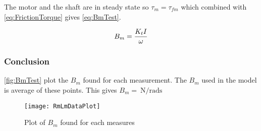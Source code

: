 The motor and the shaft are in steady state so $\tau_m=\tau_{fm}$ which combined with \autoref{eq:FrictionTorque} gives \autoref{eq:BmTest}.

\begin{equation}\label{eq:BmTest}
B_m=\frac{K_t I}{\omega} \addunit{\newton\per\radian\second}
\end{equation}
\startexplain
{}
\stopexplain

\subsubsection*{Conclusion}

\autoref{fig:BmTest} plot the $B_m$ found for each measurement. The $B_m$ used in the model is average of these points. This gives $B_m=\SI{}{\newton\per\radian\second}$

\begin{figure}[htbp]
	\centering
	\texttt{[image: RmLmDataPlot]}
	\caption{Plot of $B_m$ found for each measures}\label{fig:BmTest}
\end{figure}